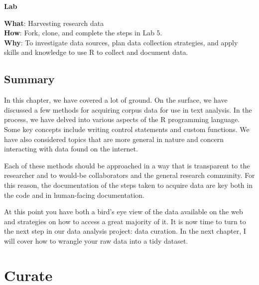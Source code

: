 \documentclass[
  letterpaper,
]{book}
\theoremstyle{definition}
\theoremstyle{remark}
\begin{document}
\begin{tcolorbox}[enhanced jigsaw, breakable, colframe=quarto-callout-color-frame, toprule=.15mm, arc=.35mm, colback=white, left=2mm, bottomrule=.15mm, rightrule=.15mm, opacityback=0, leftrule=.75mm]

\textbf{ Lab}

\textbf{What}: Harvesting research data\\
\textbf{How}: Fork, clone, and complete the steps in Lab 5.\\
\textbf{Why}: To investigate data sources, plan data collection
strategies, and apply skills and knowledge to use R to collect and
document data.

\end{tcolorbox}

\section*{Summary}\label{summary-4}


In this chapter, we have covered a lot of ground. On the surface, we
have discussed a few methods for acquiring corpus data for use in text
analysis. In the process, we have delved into various aspects of the R
programming language. Some key concepts include writing control
statements and custom functions. We have also considered topics that are
more general in nature and concern interacting with data found on the
internet.

Each of these methods should be approached in a way that is transparent
to the researcher and to would-be collaborators and the general research
community. For this reason, the documentation of the steps taken to
acquire data are key both in the code and in human-facing documentation.

At this point you have both a bird's eye view of the data available on
the web and strategies on how to access a great majority of it. It is
now time to turn to the next step in our data analysis project: data
curation. In the next chapter, I will cover how to wrangle your raw data
into a tidy dataset.

\chapter{Curate}\label{sec-curate-chapter}
\end{document}
